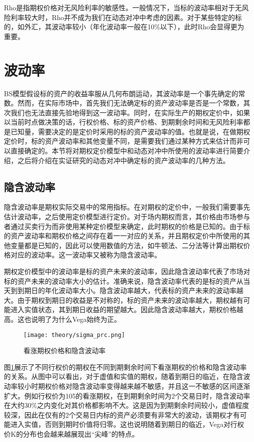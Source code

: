 Rho是指期权价格对无风险利率的敏感性。一般情况下，当标的波动率相对于无风险利率较大时，Rho并不成为我们在动态对冲中考虑的因素。对于某些特定的标的，如外汇，其波动率较小（年化波动率一般在10\%以下），此时Rho会显得更为重要。

\section{波动率}

BS模型假设标的资产的收益率服从几何布朗运动，其波动率是一个事先确定的常数。然而，在实际市场中，首先我们无法确定标的资产波动率是否是一个常数，其次我们也无法直接先验地得到这一波动率。同时，在实际生产的期权定价中，如果以当前时点做决策的话，行权价格、标的资产价格、到期剩余时间和无风险利率都是已知量，需要决定的是定价时采用的标的资产波动率的值。也就是说，在做期权定价时，标的资产波动率和其他变量不同，是需要我们通过某种方式来估计而非可以直接确定的。本节将对期权定价模型中和动态对冲中所使用的波动率进行简要介绍，之后将介绍在实证研究的动态对冲中确定标的资产波动率的几种方法。

\subsection{隐含波动率}

隐含波动率是期权实际交易中的常用指标。在对期权的定价中，一般我们需要事先估计波动率，之后使用定价模型进行定价。对于场内期权而言，其价格由市场参与者通过买卖行为而非使用某种定价模型来确定，此时期权的价格是已知的。由于标的资产波动率和期权价格之间存在着一一对应的关系，并且期权定价中所使用的其他变量都是已知的，因此可以使用数值的方法，如牛顿法、二分法等计算出期权价格对应的波动率。这一波动率又被称为隐含波动率。

期权定价模型中的波动率是标的资产未来的波动率，因此隐含波动率代表了市场对标的资产未来的波动率大小的估计。准确来说，隐含波动率代表的是标的资产从当天到到期日的年化波动率大小。隐含波动率越大，代表标的资产未来的波动率越大。由于期权到期日的收益是不对称的，标的资产未来的波动率越大，期权越有可能进入实值状态，其到期日收益的期望越大。因此隐含波动率越大，期权价格越高。这也说明了为什么Vega始终为正。

\begin{figure}[htb]
  \centering
  \texttt{[image: theory/sigma\_prc.png]}
  \caption[这里将出现在插图索引中]
    {看涨期权价格和隐含波动率}
  \label{fig:sigma_prc}
\end{figure}

图\ref{fig:sigma_prc}展示了不同行权价的期权在不同到期剩余时间下看涨期权的价格和隐含波动率的关系。从图中可以看出，对于虚值和实值的期权，随着到期日的临近，在隐含波动率较小时期权价格对隐含波动率变得越来越不敏感，并且这一不敏感的区间逐渐扩大。例如行权价为105的看涨期权，在到期剩余时间为2个交易日时，隐含波动率在大约30\%之内变化对其价格都影响不大。这是因为到期剩余时间较小，虚值程度较深，因此在仅有的2个交易日内标的资产必须要有非常大的波动，该期权才有可能进入实值，否则到期时价值将归零。这也说明随着到期日的临近，Vega对行权价K的分布也会越来越展现出“尖峰”的特点。

